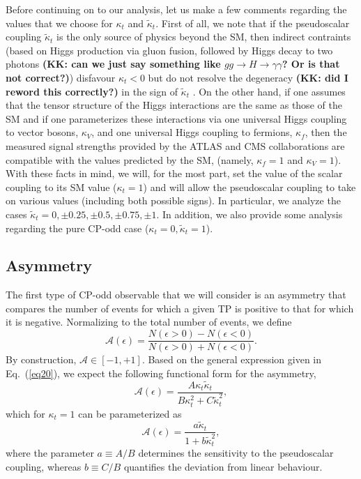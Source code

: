 \documentclass[aps,preprint,tightenlines,floatfix,superscriptaddress,nofootinbib,showpacs]{revtex4-1}
\def\beq{\begin{equation}}
\def\eeq{\end{equation}}
\def\kp{\kappa_t}
\def\kpt{\tilde{\kappa}_t}
\begin{document}
Before continuing on to our analysis, let us make a few comments
regarding the values that we choose for $\kp$ and $\kpt$.
First of all, we note that if the pseudoscalar
coupling $\kpt$ is the only source of physics beyond the SM,
then indirect contraints (based on Higgs production via gluon fusion,
followed by Higgs decay to two photons {\bf (KK: can we just say
  something like $gg\to H \to \gamma\gamma$?  Or is that not
  correct?)}) disfavour $\kp < 0$ but do not
resolve the degeneracy {\bf (KK: did I reword this correctly?)}
in the sign of $\kpt$ \cite{Guadagnoli}. On
the other hand, if one assumes that the tensor structure of the
Higgs interactions are the
same as those of the SM and if one parameterizes these interactions via
one universal Higgs coupling to vector bosons, $\kappa_V$, and one
universal Higgs coupling to fermions, $\kappa_f$, then the measured signal
strengths provided by the ATLAS and CMS collaborations are compatible with
the values predicted by the SM, (namely, $\kappa_f=1$ and $\kappa_V=1$).
With these facts in mind, we will, for the most part,
set the value of the scalar coupling to its SM
value ($\kp=1$) and will allow the pseudoscalar coupling to take on
various values (including both possible signs). In particular, we
analyze the cases $\kpt=0,\pm 0.25, \pm 0.5, \pm 0.75,\pm 1$.
In addition, we also provide some analysis regarding the pure
$\mathrm{CP}$-odd case ($\kp=0,\kpt=1$).
\subsection{Asymmetry}
\label{sec3.1}

The first type of $\mathrm{CP}$-odd observable that we will consider is an
asymmetry that compares the number of events
for which a given TP is positive to that for which it is negative.
Normalizing to the total number of events, we define
%
\beq
\label{eq21}
\mathcal{A}(\epsilon)=\frac{N(\epsilon > 0)-N(\epsilon < 0)}{N(\epsilon > 0)+N(\epsilon < 0)}.
\eeq 
%
By construction, $\mathcal{A}\in [-1,+1]$.
Based on the general expression given in Eq.~(\ref{eq20}), we expect
the following functional form for the asymmetry,
%
\beq
\label{eq22}
\mathcal{A}(\epsilon)=\frac{A\kp\kpt}{B\kappa^2_t+C\tilde{\kappa}^2_t},
\eeq 
%
which for $\kp=1$ can be parameterized as
%
\beq
\label{eq23}
\mathcal{A}(\epsilon)=\frac{a\kpt}{1+b\tilde{\kappa}^2_t},
\eeq 
%
where the parameter $a\equiv A/B$ determines the sensitivity to the
pseudoscalar coupling, whereas $b\equiv C/B$ quantifies the deviation
from linear behaviour.
\end{document}
